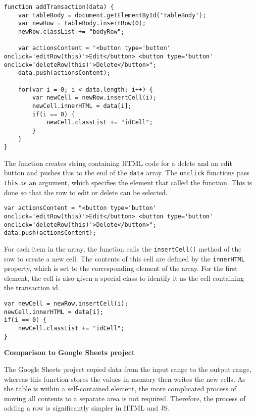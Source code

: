 \documentclass[letterpaper]{article}
\begin{document}
\begin{lstlisting}[firstnumber=139]
function addTransaction(data) {
    var tableBody = document.getElementById('tableBody');
    var newRow = tableBody.insertRow(0);
    newRow.classList += "bodyRow";

    var actionsContent = "<button type='button' onclick='editRow(this)'>Edit</button> <button type='button' onclick='deleteRow(this)'>Delete</button>";
    data.push(actionsContent);

    for(var i = 0; i < data.length; i++) {
        var newCell = newRow.insertCell(i);
        newCell.innerHTML = data[i];
        if(i == 0) {
            newCell.classList += "idCell";
        }
    }
}
\end{lstlisting}

The function creates string containing HTML code for a delete and an edit button and pushes this to the end of the \lstinline{data} array.
The \lstinline{onclick} functions pass \lstinline{this} as an argument, which specifies the element that called the function.
This is done so that the row to edit or delete can be selected.

\begin{lstlisting}[firstnumber=144]
var actionsContent = "<button type='button' onclick='editRow(this)'>Edit</button> <button type='button' onclick='deleteRow(this)'>Delete</button>";
data.push(actionsContent);
\end{lstlisting}

For each item in the array, the function calls the \lstinline{insertCell()} method of the row to create a new cell.
The contents of this cell are defined by the \lstinline{innerHTML} property, which is set to the corresponding element of the array.
For the first element, the cell is also given a special class to identify it as the cell containing the transaction id.

\begin{lstlisting}[firstnumber=148]
var newCell = newRow.insertCell(i);
newCell.innerHTML = data[i];
if(i == 0) {
    newCell.classList += "idCell";
}
\end{lstlisting}

\textbf{Comparison to Google Sheets project}

The Google Sheets project copied data from the input range to the output range, whereas this function stores the values in memory then writes the new cells.
As the table is within a self-contained element, the more complicated process of moving all contents to a separate area is not required.
Therefore, the process of adding a row is significantly simpler in HTML and JS.
\end{document}
